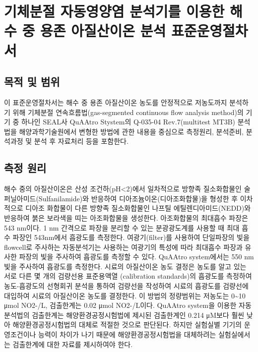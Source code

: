 \documentclass[
]{book}
\begin{document}
\hypertarget{uxae30uxccb4uxbd84uxc808-uxc790uxb3d9uxc601uxc591uxc5fc-uxbd84uxc11duxae30uxb97c-uxc774uxc6a9uxd55c-uxd574uxc218-uxc911-uxc6a9uxc874-uxc544uxc9c8uxc0b0uxc774uxc628-uxbd84uxc11d-uxd45cuxc900uxc6b4uxc601uxc808uxcc28uxc11c}{%
\chapter{기체분절 자동영양염 분석기를 이용한 해수 중 용존 아질산이온 분석 표준운영절차서}\label{uxae30uxccb4uxbd84uxc808-uxc790uxb3d9uxc601uxc591uxc5fc-uxbd84uxc11duxae30uxb97c-uxc774uxc6a9uxd55c-uxd574uxc218-uxc911-uxc6a9uxc874-uxc544uxc9c8uxc0b0uxc774uxc628-uxbd84uxc11d-uxd45cuxc900uxc6b4uxc601uxc808uxcc28uxc11c}}

\hypertarget{uxbaa9uxc801-uxbc0f-uxbc94uxc704}{%
\section{목적 및 범위}\label{uxbaa9uxc801-uxbc0f-uxbc94uxc704}}

이 표준운영절차서는 해수 중 용존 아질산이온 농도를 안정적으로 저농도까지 분석하기 위해 기체분절 연속흐름법(gas-segmented continuous flow analysis method)의 기기 중 하나인 SEAL사 QuAAtro Stystem의 Q-035-04 Rev.7(multitest MT3B) 분석법을 해양과학기술원에서 변형한 방법에 관한 내용을 중심으로 측정원리, 분석준비, 분석과정 및 분석 후 자료처리 등을 포함한다.

\hypertarget{uxce21uxc815-uxc6d0uxb9ac}{%
\section{측정 원리}\label{uxce21uxc815-uxc6d0uxb9ac}}

해수 중의 아질산이온은 산성 조건하(pH\textless2)에서 일차적으로 방향족 질소화합물인 술퍼닐아미드(Sulfanilamide)와 반응하여 디아조늄이온(디아조화합물)을 형성한 후 이차적으로 디아조 화합물이 다른 방향족 질소화합물인 나프틸 에틸렌디아미드(NEDD)와 반응하여 붉은 보라색을 띠는 아조화합물을 생성한다. 아조화합물의 최대흡수 파장은 543 nm이다.
1 nm 간격으로 파장을 분리할 수 있는 분광광도계를 사용할 때 최대 흡수 파장인 543nm에서 흡광도를 측정한다. 여광기(filter)를 사용하여 단일파장의 빛을 flowcell로 주사하는 자동분석기는 사용하는 여광기의 특성에 따라 최대흡수 파장과 유사한 파장의 빛을 주사하여 흡광도를 측정할 수 있다. QuAAtro system에서는 550 nm 빛을 주사하여 흡광도를 측정한다.
시료의 아질산이온 농도 결정은 농도를 알고 있는 서로 다른 몇 개의 검량선용 표준용액열 (calibration standards)의 흡광도를 측정하여 농도-흡광도의 선형회귀 분석을 통하여 검량선을 작성하여 시료의 흡광도를 검량선에 대입하여 시료의 아질산이온 농도를 결정한다.
이 방법의 정량범위는 저농도는 0\textasciitilde10 μmol NO2-/L, 검출한계는 0.02 μmol NO2-/L이다. QuAAtro system을 이용한 자동분석법의 검출한계는 해양환경공정시험법에 제시된 검출한계인 0.214 μM보다 훨씬 낮아 해양환경공정시험법의 대체로 적절한 것으로 판단된다. 하지만 실험실별 기기의 운영조건이나 능력이 차이가 나기 때문에 해양환경공정시험법을 대체하려는 실험실에서는 검출한계에 대한 자료를 제시하여야 한다.
\end{document}
